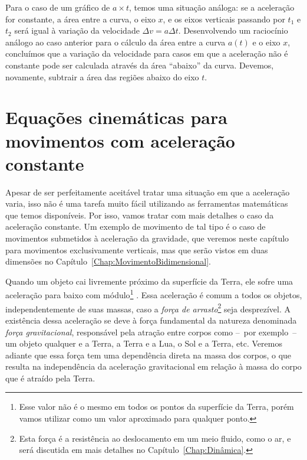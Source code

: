 Para o caso de um gráfico de $a \times t$, temos uma situação análoga: se a aceleração for constante, a área entre a curva, o eixo $x$, e os eixos verticais passando por $t_1$ e $t_2$ será igual à variação da velocidade $\Delta v = a \Delta t$. Desenvolvendo um raciocínio análogo ao caso anterior para o cálculo da área entre a curva $a(t)$ e o eixo $x$, concluímos que a variação da velocidade para casos em que a aceleração não é constante pode ser calculada através da área ``abaixo'' da curva. Devemos, novamente, subtrair a área das regiões abaixo do eixo $t$.

\section{Equações cinemáticas para movimentos com aceleração constante}

Apesar de ser perfeitamente aceitável tratar uma situação em que a aceleração varia, isso não é uma tarefa muito fácil utilizando as ferramentas matemáticas que temos disponíveis. Por isso, vamos tratar com mais detalhes o caso da aceleração constante. Um exemplo de movimento de tal tipo é o caso de movimentos submetidos à aceleração da gravidade, que veremos neste capítulo para movimentos exclusivamente verticais, mas que serão vistos em duas dimensões no Capítulo~\ref{Chap:MovimentoBidimensional}. 

Quando um objeto cai livremente próximo da superfície da Terra, ele sofre uma aceleração para baixo com módulo\footnote{Esse valor não é o mesmo em todos os pontos da superfície da Terra, porém vamos utilizar  como um valor aproximado para qualquer ponto.} . Essa aceleração é comum a todos os objetos, independentemente de suas massas, caso a \emph{força de arrasto}\footnote{Esta força é a resistência ao deslocamento em um meio fluido, como o ar, e será discutida em mais detalhes no Capítulo~\ref{Chap:Dinâmica}.} seja desprezível. A existência dessa aceleração se deve à força fundamental da natureza denominada \emph{força gravitacional}, responsável pela atração entre corpos como --~por exemplo~-- um objeto qualquer e a Terra, a Terra e a Lua, o Sol e a Terra, etc. Veremos adiante que essa força tem uma dependência direta na massa dos corpos, o que resulta na independência da aceleração gravitacional em relação à massa do corpo que é atraído pela Terra.

